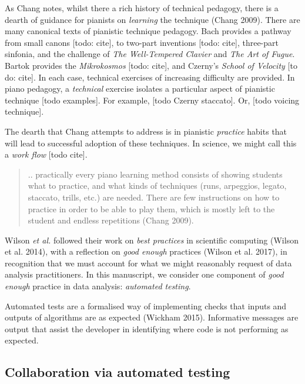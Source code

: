 \documentclass[
]{article}
\begin{document}
As Chang notes, whilst there a rich history of technical pedagogy, there
is a dearth of guidance for pianists on \emph{learning} the technique
(Chang 2009). There are many canonical texts of pianistic technique
pedagogy. Bach provides a pathway from small canons {[}todo: cite{]}, to
two-part inventions {[}todo: cite{]}, three-part sinfonia, and the
challenge of \emph{The Well-Tempered Clavier} and \emph{The Art of
Fugue}. Bartok provides the \emph{Mikrokosmos} {[}todo: cite{]}, and
Czerny's \emph{School of Velocity} {[}to do: cite{]}. In each case,
technical exercises of increasing difficulty are provided. In piano
pedagogy, a \emph{technical} exercise isolates a particular aspect of
pianistic technique {[}todo examples{]}. For example, {[}todo Czerny
staccato{]}. Or, {[}todo voicing technique{]}.

The dearth that Chang attempts to address is in pianistic
\emph{practice} habits that will lead to successful adoption of these
techniques. In science, we might call this a \emph{work flow} {[}todo
cite{]}.

\begin{quote}
.. practically every piano learning method consists of showing students
what to practice, and what kinds of techniques (runs, arpeggios, legato,
staccato, trills, etc.) are needed. There are few instructions on how to
practice in order to be able to play them, which is mostly left to the
student and endless repetitions (Chang 2009).
\end{quote}

Wilson \emph{et al.} followed their work on \emph{best practices} in
scientific computing (Wilson et al. 2014), with a reflection on
\emph{good enough} practices (Wilson et al. 2017), in recognition that
we must account for what we might reasonably request of data analysis
practitioners. In this manuscript, we consider one component of
\emph{good enough} practice in data analysis: \emph{automated testing}.

Automated tests are a formalised way of implementing checks that inputs
and outputs of algorithms are as expected (Wickham 2015). Informative
messages are output that assist the developer in identifying where code
is not performing as expected.

\hypertarget{collaboration-via-automated-testing}{%
\subsection{Collaboration via automated
testing}\label{collaboration-via-automated-testing}}
\end{document}
